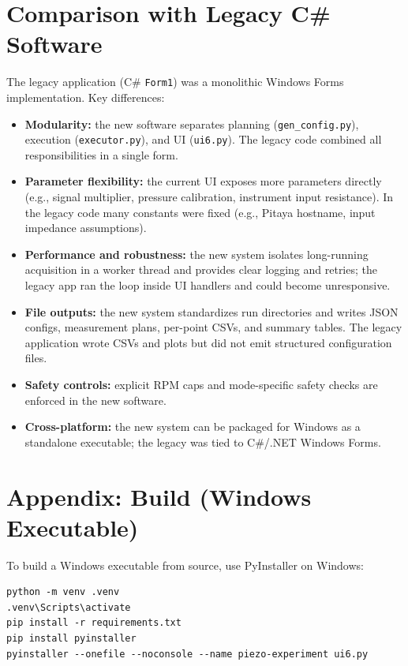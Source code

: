 \documentclass[11pt,a4paper]{article}
\begin{document}
\section{Comparison with Legacy C\# Software}
The legacy application (C\# \texttt{Form1}) was a monolithic Windows Forms implementation. Key differences:
\begin{itemize}[leftmargin=*]
\item \textbf{Modularity:} the new software separates planning (\texttt{gen\_config.py}), execution (\texttt{executor.py}), and UI (\texttt{ui6.py}). The legacy code combined all responsibilities in a single form.
\item \textbf{Parameter flexibility:} the current UI exposes more parameters directly (e.g., signal multiplier, pressure calibration, instrument input resistance). In the legacy code many constants were fixed (e.g., Pitaya hostname, input impedance assumptions).
\item \textbf{Performance and robustness:} the new system isolates long-running acquisition in a worker thread and provides clear logging and retries; the legacy app ran the loop inside UI handlers and could become unresponsive.
\item \textbf{File outputs:} the new system standardizes run directories and writes JSON configs, measurement plans, per-point CSVs, and summary tables. The legacy application wrote CSVs and plots but did not emit structured configuration files.
\item \textbf{Safety controls:} explicit RPM caps and mode-specific safety checks are enforced in the new software.
\item \textbf{Cross-platform:} the new system can be packaged for Windows as a standalone executable; the legacy was tied to C\#/.NET Windows Forms.
\end{itemize}

\section{Appendix: Build (Windows Executable)}
To build a Windows executable from source, use PyInstaller on Windows:
\begin{verbatim}
python -m venv .venv
.venv\Scripts\activate
pip install -r requirements.txt
pip install pyinstaller
pyinstaller --onefile --noconsole --name piezo-experiment ui6.py
\end{verbatim}
\end{document}
